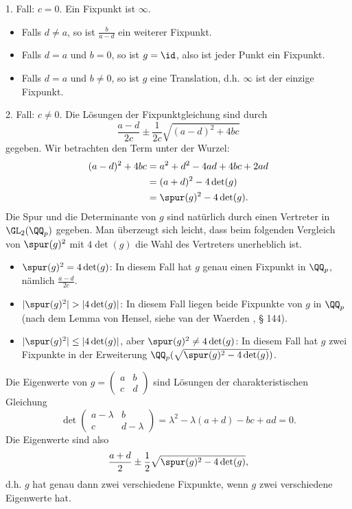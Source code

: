 1. Fall: $c=0$. Ein Fixpunkt ist $\infty$.
\begin{itemize}
\item Falls $d\neq a$, so ist $\frac{b}{a-d}$ ein weiterer Fixpunkt.
\item Falls $d=a$ und $b=0$, so ist $g=\id$, also ist jeder
Punkt ein Fixpunkt.
\item Falls $d=a$ und $b\neq 0$, so ist $g$ eine Translation,
d.h. $\infty$ ist der einzige Fixpunkt.
\end{itemize}

2. Fall: $c\neq 0$. Die Lösungen der Fixpunktgleichung sind
durch
\[
\frac{a-d}{2c}\pm \frac{1}{2c}\sqrt{(a-d)^2+4bc}
\]
gegeben. Wir betrachten den Term unter der Wurzel:
\begin{align*}
(a-d)^2+4bc &= a^2+d^2-4ad+4bc+2ad \\
&= (a+d)^2 - 4 \det(g) \\
&=\spur(g)^2 - 4 \det(g).
\end{align*}
Die Spur und die Determinante von $g$ sind natürlich durch einen
Vertreter in $\GL_2(\QQ_p)$ gegeben.
Man überzeugt sich leicht, dass beim folgenden
Vergleich von $\spur(g)^2$ mit $4\det(g)$ die Wahl des
Vertreters unerheblich ist.
\begin{itemize}
\item $\spur(g)^2=4\det(g)$: In diesem Fall hat $g$
genau einen Fixpunkt in $\QQ_p$, nämlich $\frac{a-d}{2c}$.
\item $|\spur(g)^2|>|4\det(g)|$: In diesem Fall liegen
beide Fixpunkte von $g$ in $\QQ_p$ (nach dem Lemma von Hensel,
siehe van der Waerden \cite{vdW}, § 144).
\item $|\spur(g)^2|\leq|4\det(g)|$, aber
$\spur(g)^2\neq 4\det(g)$: In diesem Fall hat $g$
zwei Fixpunkte in der Erweiterung
$\QQ_p(\sqrt{\spur(g)^2-4\det(g)})$.
\end{itemize}

\BEM Die Eigenwerte von
$g=\begin{pmatrix}a&b\\ c&d\end{pmatrix}$
sind Lösungen der charakteristischen Gleichung
\[
\det
\begin{pmatrix}a-\lambda&b\\ c&d-\lambda\end{pmatrix}
=
\lambda^2 - \lambda(a+d) - bc + ad = 0.
\]
Die Eigenwerte sind also
\[
\frac{a+d}{2} \pm \frac{1}{2}\sqrt{\spur(g)^2 - 4\det(g)},
\]
d.h. $g$ hat genau dann zwei verschiedene Fixpunkte,
wenn $g$ zwei verschiedene Eigenwerte hat.

